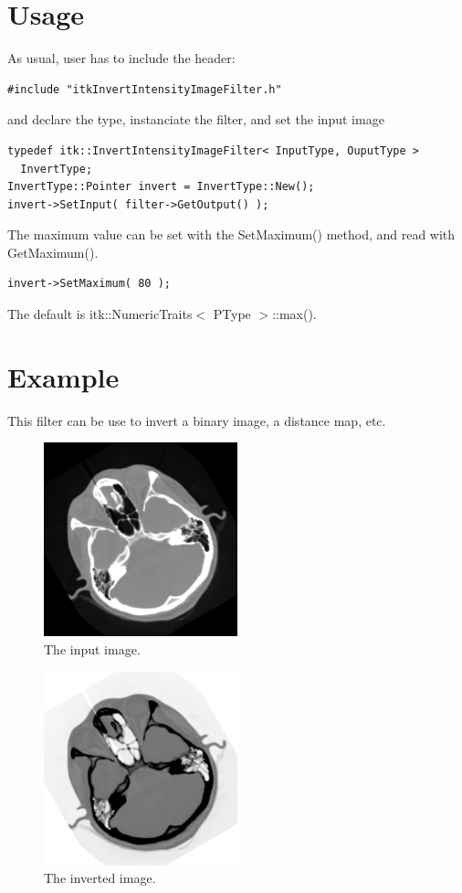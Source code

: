 \documentclass[IJ]{cesj}
\begin{document}
\section{Usage}
As usual, user has to include the header:
\begin{lstlisting}
#include "itkInvertIntensityImageFilter.h"
\end{lstlisting}
and declare the type, instanciate the filter, and set the input image
\begin{lstlisting}
typedef itk::InvertIntensityImageFilter< InputType, OuputType >
  InvertType;
InvertType::Pointer invert = InvertType::New();
invert->SetInput( filter->GetOutput() );
\end{lstlisting}
The maximum value can be set with the SetMaximum() method, and read with GetMaximum().
\begin{lstlisting}
invert->SetMaximum( 80 );
\end{lstlisting}
The default is itk::NumericTraits$<$ PType $>$::max().

\section{Example}
This filter can be use to invert a binary image, a distance map, etc.

\begin{figure}
\centering
\includegraphics[width=0.5\textwidth]{cthead1}
\caption{The input image.}
\end{figure}

\begin{figure}
\centering
\includegraphics[width=0.5\textwidth]{invert}
\caption{The inverted image.}
\end{figure}
\end{document}
